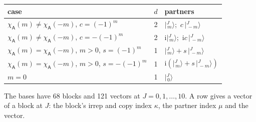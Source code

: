 \documentclass[10pt,a4paper]{article}
\numberwithin{equation}{section}
\newcommand{\grp}[1]{\mathsf{#1}}
\newcommand{\iunit}{\mathrm{i}}
\newcommand{\chiA}{\chi_{\grp{A}}}
\newcommand{\mult}{\kappa}
\newcommand{\intx}{\mu}
\newcommand{\jm}[2]{\bigl\lvert{}^{#1}_{\,#2}\bigr\rangle}
\begin{document}
\begin{center}\begin{tabular}{@{}lrl@{}}\toprule
case & $d$ & partners\\\midrule
$\chiA(m) \ne \chiA(-m)$, $c = (-1)^m$ & 2 & $\jm{J}{m}$;\ $c\,\jm{J}{-m}$\\
$\chiA(m) \ne \chiA(-m)$, $c = -(-1)^m$ & 2 & $\iunit\jm{J}{m}$;\ $\iunit c\,\jm{J}{-m}$\\
$\chiA(m) = \chiA(-m)$, $m > 0$, $s = (-1)^m$ & 1 & $\jm{J}{m} + s\,\jm{J}{-m}$\\
$\chiA(m) = \chiA(-m)$, $m > 0$, $s = -(-1)^m$ & 1 & $\iunit(\jm{J}{m} + s\,\jm{J}{-m})$\\
$m = 0$ & 1 & $\jm{J}{0}$\\
\bottomrule\end{tabular}\end{center}
The bases have 68 blocks and 121 vectors at $J = 0, 1, \dots, 10$. \label{n:head.vector}A row gives a vector of a block at $J$: the block's irrep and copy index $\mult$, the partner index $\intx$ and the vector.
\end{document}
